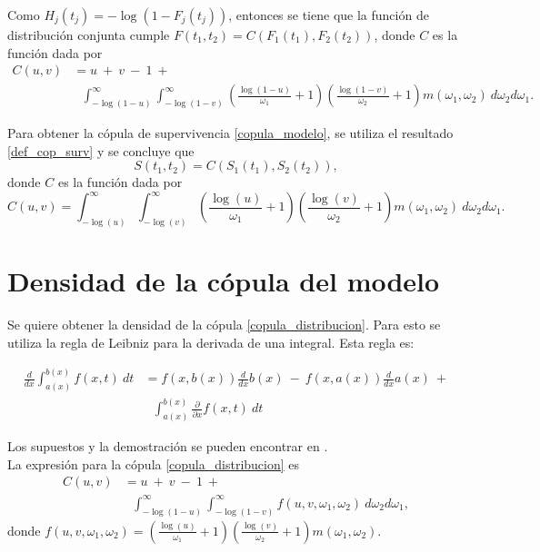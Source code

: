 \documentclass[11pt,a4paper]{article}
\begin{document}
\begin{appendices}
Como $H_j(t_j) = -\log (1-F_j(t_j))$, entonces se tiene que la función de distribución conjunta cumple $F(t_1, t_2) = C(F_1(t_1), F_2(t_2))$, donde $C$ es la función dada por
\begin{align} \label{eq:copula:original}
C(u, v) &= u \ + \ v \ - \ 1 \ + \nonumber \\
& \ \ \ \int_{-\log (1-u)}^\infty \int_{-\log (1-v)}^\infty \left( \frac{\log (1-u)}{\omega_1}+1 \right) \left( \frac{\log (1-v)}{\omega_2}+1\right) m(\omega_1, \omega_2) \ d\omega_2 d\omega_1.
\end{align}

Para obtener la cópula de supervivencia \eqref{copula_modelo}, se utiliza el resultado \ref{def_cop_surv} y se concluye que $$S(t_1, t_2) = C(S_1(t_1), S_2(t_2)),$$ donde $C$ es la función dada por $$C(u, v) = \int_{-\log (u)}^\infty \int_{-\log (v)}^\infty \left( \frac{\log (u)}{\omega_1}+1 \right) \left( \frac{\log (v)}{\omega_2}+1\right) m(\omega_1, \omega_2) \ d\omega_2 d\omega_1.$$

\newpage

\section{Densidad de la cópula del modelo}
\label{sec_densidad_copula_modelo}

Se quiere obtener la densidad de la cópula \eqref{copula_distribucion}. Para esto se utiliza la regla de Leibniz para la derivada de una integral. Esta regla es:

\begin{align}\label{regla_leibniz}
\frac{d}{dx} \int_{a(x)}^{b(x)} f(x, t) \ dt &= f(x, b(x)) \frac{d}{dx}b(x) \ - \ f(x, a(x))\frac{d}{dx}a(x) \ + \nonumber\\
&\ \ \ \int_{a(x)}^{b(x)}\frac{\partial}{\partial x} f(x, t) \ dt
\end{align}

Los supuestos y la demostración se pueden encontrar en \citet{flanders}.\\

La expresión para la cópula \eqref{copula_distribucion} es
\begin{align*}
C(u, v) &= u \ + \ v \ - \ 1 \ +\\ 
& \ \ \ \int_{-\log (1-u)}^\infty \int_{-\log (1-v)}^\infty f(u, v, \omega_1, \omega_2) \ d\omega_2 d\omega_1,
\end{align*}
donde $f(u, v, \omega_1, \omega_2) = \left( \frac{\log (u)}{\omega_1}+1 \right) \left( \frac{\log (v)}{\omega_2}+1\right) m(\omega_1, \omega_2)$.\\


\end{appendices}
\end{document}
